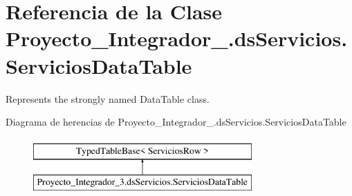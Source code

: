 \hypertarget{class_proyecto___integrador__3_1_1ds_servicios_1_1_servicios_data_table}{\section{Referencia de la Clase Proyecto\-\_\-\-Integrador\-\_.\-ds\-Servicios.\-Servicios\-Data\-Table}
\label{class_proyecto___integrador__3_1_1ds_servicios_1_1_servicios_data_table}
}


Represents the strongly named Data\-Table class.  


Diagrama de herencias de Proyecto\-\_\-\-Integrador\-\_.\-ds\-Servicios.\-Servicios\-Data\-Table\begin{figure}[H]
\begin{center}
\leavevmode
\includegraphics[height=2.000000cm]{class_proyecto___integrador__3_1_1ds_servicios_1_1_servicios_data_table}
\end{center}
\end{figure}
